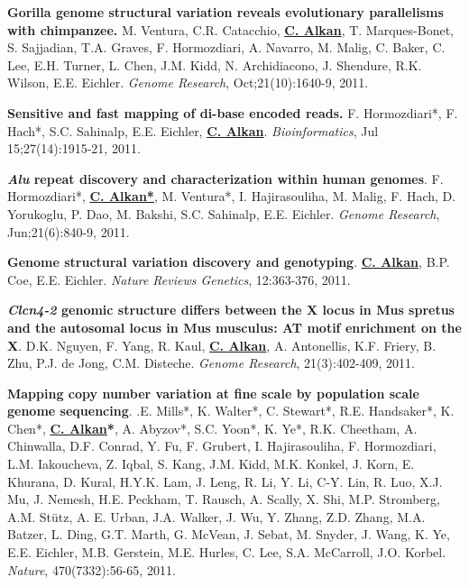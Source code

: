 \documentclass[margin,line]{res}
\begin{document}
\begin{resume}
\vspace{-.2cm}
{\bf Gorilla genome structural variation reveals evolutionary parallelisms with chimpanzee.}
M. Ventura, C.R. Catacchio, {\bf {\underline {C. Alkan}}}, T. Marques-Bonet, S. Sajjadian, T.A. Graves, F. Hormozdiari, A. Navarro, 
M. Malig, C. Baker, C. Lee, E.H. Turner, L. Chen, J.M. Kidd, N. Archidiacono, J. Shendure, R.K. Wilson, E.E. Eichler.
{\em Genome Research}, Oct;21(10):1640-9, 2011.


\vspace{-.2cm}
{\bf Sensitive and fast mapping of di-base encoded reads.}
F. Hormozdiari*, F. Hach*, S.C. Sahinalp, E.E. Eichler, {\bf {\underline {C. Alkan}}}.
{\em Bioinformatics}, Jul 15;27(14):1915-21, 2011.

\clearpage

\vspace{-.2cm}
{\bf \textit {Alu} repeat discovery and characterization within human genomes}.
F. Hormozdiari*, {\bf {\underline {C. Alkan*}}}, M. Ventura*, I. Hajirasouliha, M. Malig, 
F. Hach, D. Yorukoglu, P. Dao, M. Bakshi, S.C. Sahinalp, E.E. Eichler.
{\em Genome Research}, Jun;21(6):840-9, 2011.

\vspace{-.2cm}
{\bf Genome structural variation discovery and genotyping}. 
{\bf {\underline {C. Alkan}}}, B.P. Coe, E.E. Eichler.
{\em Nature Reviews Genetics}, 12:363-376, 2011.

\vspace{-.2cm}
{\bf {\em Clcn4-2} genomic structure differs between the X locus in Mus spretus and the autosomal 
locus in Mus musculus: AT motif enrichment on the X}.  
D.K. Nguyen, F. Yang, R. Kaul, {\bf {\underline {C. Alkan}}}, A. Antonellis, K.F. Friery, 
B. Zhu, P.J. de Jong, C.M. Disteche. 
{\em Genome Research}, 21(3):402-409, 2011.


\vspace{-.2cm}
{\bf Mapping copy number variation at fine scale by population scale genome sequencing}.
.E. Mills*, K. Walter*, C. Stewart*, R.E. Handsaker*, K. Chen*, 
{\bf {\underline {C. Alkan}*}}, A. Abyzov*, S.C. Yoon*, K. Ye*, R.K. Cheetham, 
A. Chinwalla, D.F. Conrad, Y. Fu, F. Grubert, I. Hajirasouliha, 
F. Hormozdiari, L.M. Iakoucheva, Z. Iqbal, S. Kang, J.M. Kidd, 
M.K. Konkel, J. Korn, E. Khurana, D. Kural, H.Y.K. Lam, J. Leng, 
R. Li, Y. Li, C-Y. Lin, R. Luo, X.J. Mu, J. Nemesh,
H.E. Peckham, T. Rausch, A. Scally, X. Shi, M.P. Stromberg, 
A.M. St\"{u}tz, A. E. Urban, J.A. Walker, J. Wu, Y. Zhang, 
Z.D. Zhang, M.A. Batzer, L. Ding, G.T. Marth, G. McVean, 
J. Sebat, M. Snyder, J. Wang, K. Ye, E.E. Eichler, 
M.B. Gerstein, M.E. Hurles, C. Lee, S.A. McCarroll,  J.O. Korbel.
{\em Nature}, 470(7332):56-65, 2011.



\end{resume}
\end{document}
